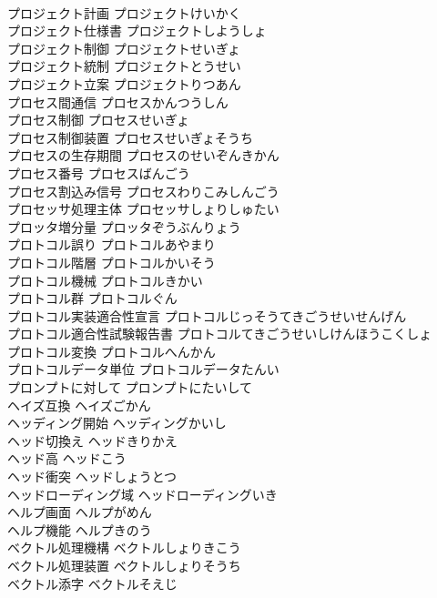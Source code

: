 \documentclass[8pt]{extreport}
\begin{document}
\begin{CJK}{UTF8}{min}
\\	プロジェクト計画	プロジェクトけいかく	
\\	プロジェクト仕様書	プロジェクトしようしょ	
\\	プロジェクト制御	プロジェクトせいぎょ	
\\	プロジェクト統制	プロジェクトとうせい	
\\	プロジェクト立案	プロジェクトりつあん	
\\	プロセス間通信	プロセスかんつうしん	
\\	プロセス制御	プロセスせいぎょ	
\\	プロセス制御装置	プロセスせいぎょそうち	
\\	プロセスの生存期間	プロセスのせいぞんきかん	
\\	プロセス番号	プロセスばんごう	
\\	プロセス割込み信号	プロセスわりこみしんごう	
\\	プロセッサ処理主体	プロセッサしょりしゅたい	
\\	プロッタ増分量	プロッタぞうぶんりょう	
\\	プロトコル誤り	プロトコルあやまり	
\\	プロトコル階層	プロトコルかいそう	
\\	プロトコル機械	プロトコルきかい	
\\	プロトコル群	プロトコルぐん	
\\	プロトコル実装適合性宣言	プロトコルじっそうてきごうせいせんげん	
\\	プロトコル適合性試験報告書	プロトコルてきごうせいしけんほうこくしょ	
\\	プロトコル変換	プロトコルへんかん	
\\	プロトコルデータ単位	プロトコルデータたんい	
\\	プロンプトに対して	プロンプトにたいして	
\\	ヘイズ互換	ヘイズごかん	
\\	ヘッディング開始	ヘッディングかいし	
\\	ヘッド切換え	ヘッドきりかえ	
\\	ヘッド高	ヘッドこう	
\\	ヘッド衝突	ヘッドしょうとつ	
\\	ヘッドローディング域	ヘッドローディングいき	
\\	ヘルプ画面	ヘルプがめん	
\\	ヘルプ機能	ヘルプきのう	
\\	ベクトル処理機構	ベクトルしょりきこう	
\\	ベクトル処理装置	ベクトルしょりそうち	
\\	ベクトル添字	ベクトルそえじ	

\end{CJK}
\end{document}
